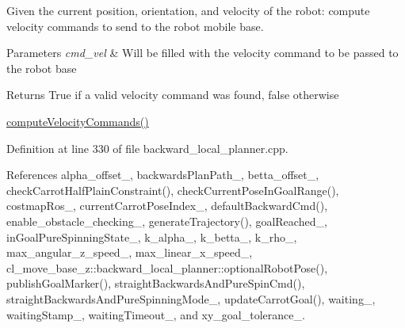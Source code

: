 Given the current position, orientation, and velocity of the robot\+: compute velocity commands to send to the robot mobile base. 


\begin{DoxyParams}{Parameters}
{\em cmd\+\_\+vel} & Will be filled with the velocity command to be passed to the robot base \\
\hline
\end{DoxyParams}
\begin{DoxyReturn}{Returns}
True if a valid velocity command was found, false otherwise
\end{DoxyReturn}
\hyperlink{classcl__move__base__z_1_1backward__local__planner_1_1BackwardLocalPlanner_a25437208766366ca22f967fe72e80988}{compute\+Velocity\+Commands()} 

Definition at line 330 of file backward\+\_\+local\+\_\+planner.\+cpp.



References alpha\+\_\+offset\+\_\+, backwards\+Plan\+Path\+\_\+, betta\+\_\+offset\+\_\+, check\+Carrot\+Half\+Plain\+Constraint(), check\+Current\+Pose\+In\+Goal\+Range(), costmap\+Ros\+\_\+, current\+Carrot\+Pose\+Index\+\_\+, default\+Backward\+Cmd(), enable\+\_\+obstacle\+\_\+checking\+\_\+, generate\+Trajectory(), goal\+Reached\+\_\+, in\+Goal\+Pure\+Spinning\+State\+\_\+, k\+\_\+alpha\+\_\+, k\+\_\+betta\+\_\+, k\+\_\+rho\+\_\+, max\+\_\+angular\+\_\+z\+\_\+speed\+\_\+, max\+\_\+linear\+\_\+x\+\_\+speed\+\_\+, cl\+\_\+move\+\_\+base\+\_\+z\+::backward\+\_\+local\+\_\+planner\+::optional\+Robot\+Pose(), publish\+Goal\+Marker(), straight\+Backwards\+And\+Pure\+Spin\+Cmd(), straight\+Backwards\+And\+Pure\+Spinning\+Mode\+\_\+, update\+Carrot\+Goal(), waiting\+\_\+, waiting\+Stamp\+\_\+, waiting\+Timeout\+\_\+, and xy\+\_\+goal\+\_\+tolerance\+\_\+.


